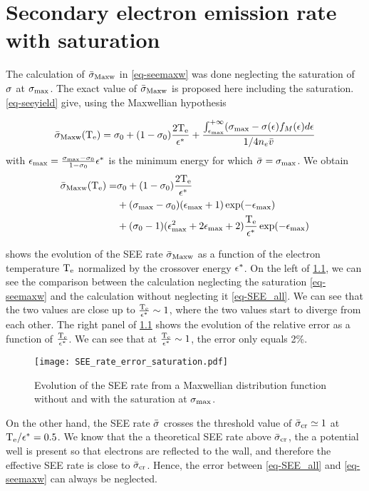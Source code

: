 
\chapter{Secondary electron emission rate with saturation}
\label{an-SEE_exact}

The calculation of $ \bar{\sigma }_{\rm Maxw}$ in \cref{eq-seemaxw} was done neglecting the saturation of $\sigma $ at $\sigma_{\rm max}$.
The exact value of  $ \bar{\sigma }_{\rm Maxw}$ is proposed here including the saturation.
\cref{eq-seeyield} give, using the Maxwellian hypothesis

\begin{equation} \label{eq-SEE_sat}
   \bar{\sigma }_{\rm Maxw}(\mathrm{T_e}) = \sigma _0 + (1 - \sigma _0) \frac{2 \mathrm{T_e}}{\epsilon^{*}} + \frac{\int_{\epsilon_{\max}}^{+ \infty} (\sigma _{\rm max}  - \sigma (\epsilon) f_M(\epsilon) d\epsilon}{1/4 n_e \bar{v}}
\end{equation}
with  $\epsilon_{\max}= \frac{\sigma _{\rm max}  - \sigma _0}{1 - \sigma _0} \epsilon^{*} $ is the minimum energy for which $ \bar{\sigma } = \sigma _{\rm max} $.
We obtain
\begin{align}  \label{eq-SEE_all}
   \bar{\sigma }_{\rm Maxw}(\mathrm{T_e}) =& \sigma _0 + (1 - \sigma _0) \frac{2 \mathrm{T_e}}{\epsilon^{*}} \\
  & + (\sigma _{\rm max}  - \sigma _0) (\epsilon_{\max} + 1 )\exp(- \epsilon_{\max}) \\
  & + (\sigma _0-1) (\epsilon_{\max}^2 +2\epsilon_{\max} + 2)\frac{\mathrm{T_e}}{\epsilon^{*}} \exp(-\epsilon_{\max}) 
\end{align}

 shows the evolution of the \ac{SEE} rate $ \bar{\sigma }_{\rm Maxw}$ as a function of the electron temperature $\mathrm{T_e}$ normalized by the crossover energy $\epsilon^{*}$.
On the left of \cref{fig-see_error}, we can see the comparison between the calculation neglecting the saturation  \cref{eq-seemaxw} and the calculation without neglecting it  \cref{eq-SEE_all}.
We can see that the two values are close up to $\frac{\mathrm{T_e}}{\epsilon^{*}}\sim 1$, where the two values start to diverge from each other.
The right panel of \cref{fig-see_error} shows the evolution of the relative error as a function of $\frac{\mathrm{T_e}}{\epsilon^{*}}$.
We can see that at $\frac{\mathrm{T_e}}{\epsilon^{*}}\sim 1$, the error only equals 2\%.
\begin{figure}[hbtp]
  \centering
  \texttt{[image: SEE\_rate\_error\_saturation.pdf]}
  \caption{Evolution of the \acs{SEE} rate from a Maxwellian distribution function without and with the saturation at $\sigma_{\rm max}$.}
  \label{fig-see_error}
\end{figure}

On the other hand, the \ac{SEE} rate $ \bar{\sigma }$ crosses the threshold value of $ \bar{\sigma }_{\rm cr} \simeq 1$ at $\mathrm{T_e}/\epsilon^{*} = 0.5$.
We know that the a theoretical \ac{SEE} rate above $ \bar{\sigma }_{\rm cr}$, the a potential well is present so that electrons are reflected to the wall, and therefore the effective \ac{SEE} rate is close to $ \bar{\sigma }_{\rm cr}$.
Hence, the error between  \cref{eq-SEE_all} and \cref{eq-seemaxw} can always be neglected.

